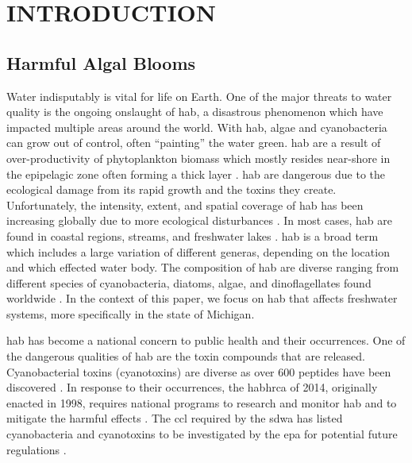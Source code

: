 
\chapter{INTRODUCTION}
\section{Harmful Algal Blooms}

Water indisputably is vital for life on Earth. One of the major threats to water quality is the ongoing onslaught of \gls{hab}, a disastrous phenomenon which have impacted multiple areas around the world. With \gls{hab}, algae and cyanobacteria can grow out of control, often ``painting'' the water green. \gls{hab} are a result of over-productivity of phytoplankton biomass which mostly resides near-shore in the epipelagic zone often forming a thick layer \cite{moore_richard_cyanobacterial_1993}.  \gls{hab} are dangerous due to the ecological damage from its rapid growth and the toxins they create. Unfortunately, the intensity, extent, and spatial coverage of \gls{hab} has been increasing globally due to more ecological disturbances \cite{codd_cyanobacterial_1999}. In most cases, \gls{hab} are found in coastal regions, streams, and freshwater lakes \cite{rastogi_cyanotoxin-microcystins:_2014}. \gls{hab} is a broad term which includes a large variation of different generas, depending on the location and which effected water body. The composition of \gls{hab} are diverse ranging from  different species of cyanobacteria, diatoms, algae, and dinoflagellates found worldwide \cite{dittmann_cyanobacterial_2012}. In the context of this paper, we focus on \gls{hab} that affects freshwater systems, more specifically in the state of Michigan.

\gls{hab} has become a national concern to public health and their occurrences. One of the dangerous qualities of \gls{hab} are the toxin compounds that are released. Cyanobacterial toxins (cyanotoxins) are diverse as over 600 peptides have been discovered \cite{welker_cyanobacterial_2006}. In response to their occurrences, the \gls{habhrca} of 2014, originally enacted in 1998, requires national programs to research and monitor \gls{hab} and to mitigate the harmful effects \cite{noauthor_harmful_2014}. The \gls{ccl} required by the \gls{sdwa} has listed cyanobacteria and cyanotoxins to be investigated by the \gls{epa} for potential future regulations \cite{usepa_drinking_2016}. 

